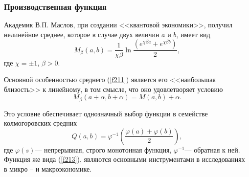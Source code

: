 \documentclass[10pt, pdf, hyperref={unicode}]{beamer}
\begin{document}
    \begin{frame}
        \frametitle{Производственная функция}
        \begin{center}
            \begin{minipage}[h]{0.97\linewidth}
                Академик В.П. Маслов, при создании <<квантовой экономики>>, получил нелинейное среднее, которое в случае двух величин $a$ и $b$, имеет вид
                \begin{equation}\label{f211}
                M_\beta(a,b)=\frac1{\chi\beta}\ln\frac{(e^{\chi\beta a}+e^{\chi\beta b})}2,
                \end{equation}
                где $\chi=\pm1$, $\beta>0$.

                Основной особенностью среднего (\ref{f211}) является его <<наибольшая близость>> к линейному, в том смысле, что оно удовлетворяет условию
                \begin{equation}\label{f212}
                M_\beta(a+\alpha,b+\alpha)=M(a,b)+\alpha.
                \end{equation}

                Это условие обеспечивает однозначный выбор функции в семействе колмогоровских средних
                \begin{equation}\label{f213}
                Q(a,b)=\varphi^{-1}\left(\frac{\varphi(a)+\varphi(b)}2\right),
                \end{equation}
                где $\varphi(s)$--- непрерывная, строго монотонная функция, $\varphi^{-1}$--- обратная к ней. Функция же вида (\ref{f213}),
                являются основными инструментами в исследованиях в микро -- и макроэкономике.
            \end{minipage}
        \end{center}
    \end{frame}
\end{document}
